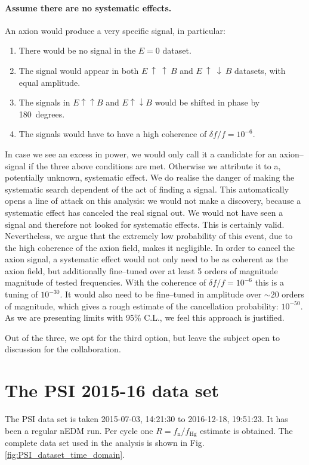 \paragraph{Assume there are no systematic effects.}
An axion would produce a very specific signal, in particular:
\begin{enumerate}
  \item There would be no signal in the $E=0$ dataset.
  \item The signal would appear in both $E~\uparrow~\uparrow~B$ and $E~\uparrow~\downarrow~B$ datasets, with equal amplitude.
  \item The signals in $E \uparrow \uparrow B$ and $E \uparrow \downarrow B$ would be shifted in phase by 180~degrees.
  \item The signals would have to have a high coherence of $\delta f / f = 10^{-6}$.
\end{enumerate}
In case we see an excess in power, we would only call it a candidate for an axion--signal if the three above conditions are met. Otherwise we attribute it to a, potentially unknown, systematic effect. We do realise the danger of making the systematic search dependent of the act of finding a signal. This automatically opens a line of attack on this analysis: we would not make a discovery, because a systematic effect has canceled the real signal out. We would not have seen a signal and therefore not looked for systematic effects. This is certainly valid. Nevertheless, we argue that the extremely low probability of this event, due to the high coherence of the axion field, makes it negligible. In order to cancel the axion signal, a systematic effect would not only need to be as coherent as the axion field, but additionally fine--tuned over at least 5 orders of magnitude magnitude of tested frequencies. With the coherence of $\delta f / f = 10^{-6}$ this is a tuning of $10^{-30}$. It would also need to be fine--tuned in amplitude over $\sim 20$ orders of magnitude, which gives a rough estimate of the cancellation probability: $10^{-50}$. As we are presenting limits with 95\% C.L., we feel this approach is justified.

Out of the three, we opt for the third option, but leave the subject open to discussion for the collaboration.








\section{The PSI 2015-16 data set}
The PSI data set is taken 2015-07-03, 14:21:30 to 2016-12-18, 19:51:23. It has been a regular nEDM run. Per cycle one $R = f_\mathrm{n} / f_\mathrm{Hg}$ estimate is obtained. The complete data set used in the analysis is shown in Fig.\,\ref{fig:PSI_dataset_time_domain}.

